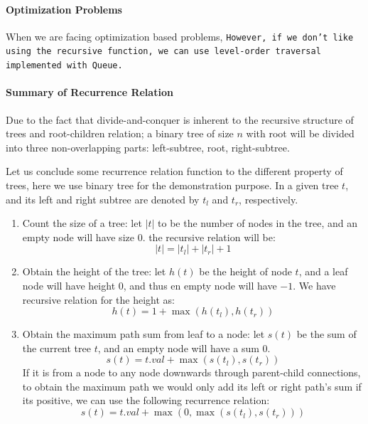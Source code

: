 \documentclass[../main.tex]{subfiles}
\begin{document}
\paragraph{Optimization Problems}
When we are facing optimization based problems, \texttt{However, if we don't like using the recursive function, we can use level-order traversal implemented with Queue.}

\paragraph{Summary of Recurrence Relation} Due to the fact that divide-and-conquer is inherent to the recursive structure of trees and root-children relation; a binary tree of size $n$ with root will be divided into three non-overlapping parts: left-subtree, root, right-subtree. %

Let us conclude some recurrence relation function to the different property of trees, here we use binary tree for the demonstration purpose. In a given tree $t$, and its left and right subtree are denoted by $t_l$ and $t_r$, respectively.
\begin{enumerate}
    \item Count the size of a tree: let $|t|$ to be the number of nodes in the tree, and an empty node will have size $0$. the recursive relation will be:
    \begin{equation}
        |t| = |t_l|+|t_r|+1
    \end{equation}
    \item Obtain the height of the tree: let $h(t)$ be the height of node $t$, and a leaf node will have height $0$, and thus en empty node will have $-1$. We have recursive relation for the height as:
    \begin{equation}
        h(t) = 1 + \max{(h(t_l), h(t_r))}
    \end{equation}
    \item Obtain the maximum path sum from leaf to a node: let $s(t)$ be the sum of the current tree $t$, and an empty node will have a sum $0$.
    \begin{equation}
        s(t) = t.val + \max{(s(t_l), s(t_r))}
    \end{equation}
    If it is from a node to any node downwards through parent-child connections, to obtain the maximum path we would only add its left or right path's sum if its positive, we can use the following recurrence relation:
    \begin{equation}
        s(t) = t.val + \max(0, \max{(s(t_l), s(t_r))})
    \end{equation}
\end{enumerate}
\end{document}
